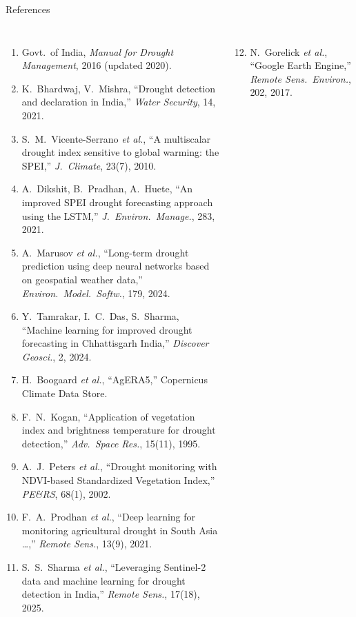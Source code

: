 \documentclass[aspectratio=169,10pt]{beamer}
\begin{document}
\begin{frame}{References}
\fontsize{6.5}{7.7}\selectfont
\begin{columns}[T,onlytextwidth]
\begin{enumerate}\setlength{\itemsep}{0.6pt}
\item Govt.\ of India, \emph{Manual for Drought Management}, 2016 (updated 2020).
\item K.~Bhardwaj, V.~Mishra, ``Drought detection and declaration in India,'' \emph{Water Security}, 14, 2021.
\item S.~M.~Vicente-Serrano \emph{et al.}, ``A multiscalar drought index sensitive to global warming: the SPEI,'' \emph{J.\ Climate}, 23(7), 2010.
\item A.~Dikshit, B.~Pradhan, A.~Huete, ``An improved SPEI drought forecasting approach using the LSTM,'' \emph{J.\ Environ.\ Manage.}, 283, 2021.
\item A.~Marusov \emph{et al.}, ``Long-term drought prediction using deep neural networks based on geospatial weather data,'' \emph{Environ.\ Model.\ Softw.}, 179, 2024.
\item Y.~Tamrakar, I.~C.~Das, S.~Sharma, ``Machine learning for improved drought forecasting in Chhattisgarh India,'' \emph{Discover Geosci.}, 2, 2024.
\item H.~Boogaard \emph{et al.}, ``AgERA5,'' Copernicus Climate Data Store.
\item F.~N.~Kogan, ``Application of vegetation index and brightness temperature for drought detection,'' \emph{Adv.\ Space Res.}, 15(11), 1995.
\item A.~J.~Peters \emph{et al.}, ``Drought monitoring with NDVI-based Standardized Vegetation Index,'' \emph{PE\&RS}, 68(1), 2002.
\item F.~A.~Prodhan \emph{et al.}, ``Deep learning for monitoring agricultural drought in South Asia \ldots,'' \emph{Remote Sens.}, 13(9), 2021.
\item S.~S.~Sharma \emph{et al.}, ``Leveraging Sentinel-2 data and machine learning for drought detection in India,'' \emph{Remote Sens.}, 17(18), 2025.
\end{enumerate}
\begin{enumerate}\setcounter{enumi}{11}\setlength{\itemsep}{0.6pt}
\item N.~Gorelick \emph{et al.}, ``Google Earth Engine,'' \emph{Remote Sens.\ Environ.}, 202, 2017.

\end{enumerate}
\end{columns}
\end{frame}
\end{document}
